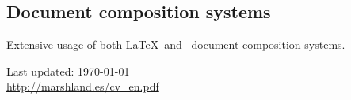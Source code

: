 \documentclass[11pt, a4paper]{article}
\begin{document}
\subsection*{Document composition systems}
\noindent
	Extensive usage of both \LaTeX\ and \XeTeX\ document composition systems.


\vfill{}
\hrulefill


\begin{center}
{\scriptsize
	Last updated: \today \\
	\href{http://marshland.es/cv_en.pdf}
	     {http://marshland.es/cv\_en.pdf}
}
\end{center}
\end{document}
